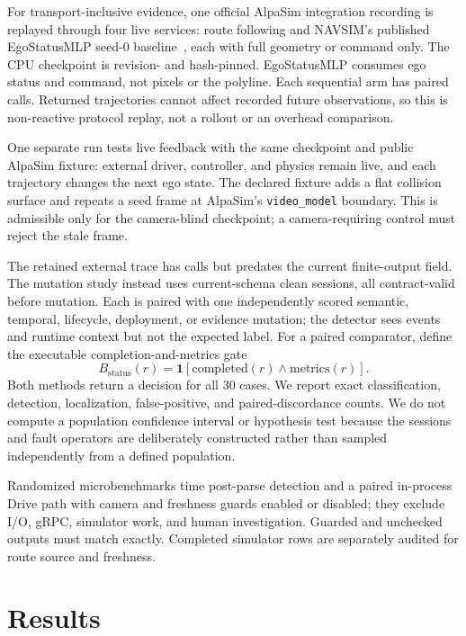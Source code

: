 \documentclass[a4paper,10pt,conference]{ieeeconf}
\begin{document}
For transport-inclusive evidence, one official AlpaSim integration recording is replayed
through four live services: route following and NAVSIM's published EgoStatusMLP seed-0
baseline~\cite{dauner2024navsim,dauner2024navsimbaselines}, each with full geometry or
command only. The CPU checkpoint is revision- and hash-pinned. EgoStatusMLP consumes ego
status and command, not pixels or the polyline. Each sequential arm has
\CVMReplayDriveRPCsPerArm{} paired calls. Returned trajectories cannot affect recorded
future observations, so this is non-reactive protocol replay, not a rollout or an
overhead comparison.

One separate run tests live feedback with the same checkpoint and public AlpaSim
fixture: external driver, controller, and physics remain live, and each trajectory
changes the next ego state. The declared fixture adds a flat collision surface and
repeats a seed frame at AlpaSim's \texttt{video\_model} boundary. This is admissible only
for the camera-blind checkpoint; a camera-requiring control must reject the stale frame.

The retained external trace has \CVMExternalChallengeDriveRPCs{} calls but predates the
current finite-output field. The mutation study instead uses
\CVMProtocolTraceSessions{} current-schema clean sessions, all contract-valid before
mutation. Each is paired with one independently scored semantic, temporal, lifecycle,
deployment, or evidence mutation; the detector sees events and runtime context but not
the expected label.
For a paired comparator, define the executable completion-and-metrics gate
\begin{equation}
B_{\mathrm{status}}(r)=
\mathbf{1}[\text{completed}(r)\land\text{metrics}(r)].
\end{equation}
Both methods return a decision for all 30 cases. We report exact classification,
detection, localization, false-positive, and paired-discordance counts. We do not
compute a population confidence interval or hypothesis test because the sessions and
fault operators are deliberately constructed rather than sampled independently from a
defined population.

Randomized microbenchmarks time post-parse detection and a paired in-process Drive path
with camera and freshness guards enabled or disabled; they exclude I/O, gRPC, simulator
work, and human investigation. Guarded and unchecked outputs must match exactly.
Completed simulator rows are separately audited for route source and freshness.

\section{Results}
\end{document}
